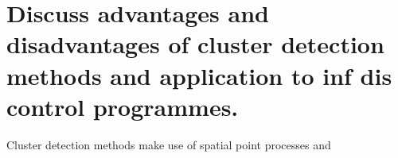 \documentclass[11pt,a4paper]{article}
\begin{document}
\section{Discuss advantages and disadvantages of cluster detection methods and application to inf dis control programmes.}

Cluster detection methods make use of spatial point processes and 

\end{document}
